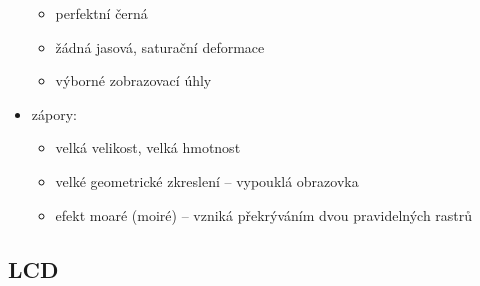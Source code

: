 \documentclass[a4paper,12pt]{article}
\providecommand{\tightlist}{%
\setlength{\itemsep}{0pt}\setlength{\parskip}{0pt}}
\begin{document}
\begin{itemize}
\begin{itemize}
    \item perfektní černá
    \item žádná jasová, saturační deformace
    \item výborné zobrazovací úhly
  \end{itemize}
  \item zápory:
  \begin{itemize}
    \tightlist
    \item velká velikost, velká hmotnost
    \item velké geometrické zkreslení -- vypouklá obrazovka
    \item efekt moaré (moiré) -- vzniká překrýváním dvou pravidelných rastrů
  \end{itemize}
\end{itemize}

\subsection{LCD}
\end{document}
